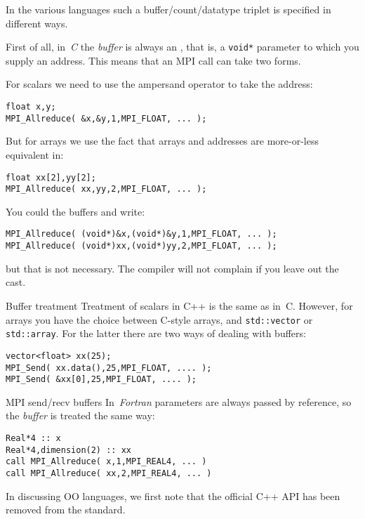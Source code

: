 In the various languages such a buffer/count/datatype triplet is specified in
different ways.

First of all, in~\emph{C} the
\emph{buffer}
is always an , that is,
a \lstinline+void*+ parameter to which you supply an address.
This means that an MPI call can take two forms.

For scalars we need to use the ampersand operator to take the address:
\begin{lstlisting}
float x,y;
MPI_Allreduce( &x,&y,1,MPI_FLOAT, ... );
\end{lstlisting}
But for arrays we use the fact that arrays and addresses are more-or-less
equivalent in:
\begin{lstlisting}
float xx[2],yy[2];
MPI_Allreduce( xx,yy,2,MPI_FLOAT, ... );
\end{lstlisting}
You could  the buffers and write:
\begin{lstlisting}
MPI_Allreduce( (void*)&x,(void*)&y,1,MPI_FLOAT, ... );
MPI_Allreduce( (void*)xx,(void*)yy,2,MPI_FLOAT, ... );
\end{lstlisting}
but that is not necessary. The compiler will not complain
if you leave out the cast.

\begin{cppnote}{Buffer treatment}
  Treatment of scalars in C++ is the same as in~C.
  However, for arrays you have the choice between C-style arrays,
  and \lstinline+std::vector+ or \lstinline+std::array+.
  For the latter there are two ways of dealing with buffers:
\begin{lstlisting}
vector<float> xx(25);
MPI_Send( xx.data(),25,MPI_FLOAT, .... );
MPI_Send( &xx[0],25,MPI_FLOAT, .... );
\end{lstlisting}
\end{cppnote}

\begin{fortrannote}{MPI send/recv buffers}
  In~\emph{Fortran} parameters are always passed by reference,
  so the \emph{buffer}
  is treated the same way:
\begin{lstlisting}
Real*4 :: x
Real*4,dimension(2) :: xx
call MPI_Allreduce( x,1,MPI_REAL4, ... )
call MPI_Allreduce( xx,2,MPI_REAL4, ... )
\end{lstlisting}
\end{fortrannote}

In discussing \ac{OO} languages, we first note that
the official C++ \ac{API} has been removed from the standard.

